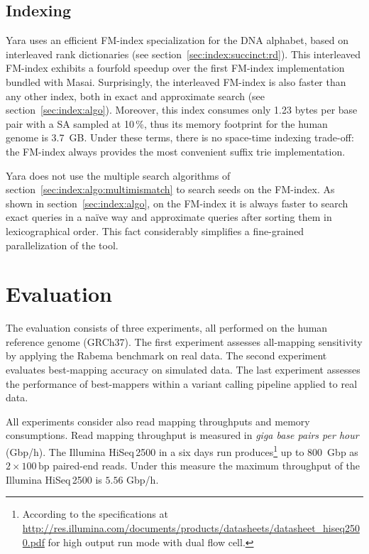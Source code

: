 \subsection{Indexing}
\label{sec:yara:eng:indexing}

Yara uses an efficient FM-index specialization for the DNA alphabet, based on interleaved rank dictionaries (see section~\ref{sec:index:succinct:rd}).
This interleaved FM-index exhibits a fourfold speedup over the first FM-index implementation bundled with Masai.
Surprisingly, the interleaved FM-index is also faster than any other index, both in exact and approximate search (see section~\ref{sec:index:algo}).
Moreover, this index consumes only 1.23 bytes per base pair with a SA sampled at 10\,\%, thus its memory footprint for the human genome is 3.7~GB.
Under these terms, there is no space-time indexing trade-off: the FM-index always provides the most convenient suffix trie implementation.

Yara does not use the multiple search algorithms of section~\ref{sec:index:algo:multimismatch} to search seeds on the FM-index.
As shown in section~\ref{sec:index:algo}, on the FM-index it is always faster to search exact queries in a na\"ive way and approximate queries after sorting them in lexicographical order.
This fact considerably simplifies a fine-grained parallelization of the tool.



\section{Evaluation}
\label{sec:yara:eval}

The evaluation consists of three experiments, all performed on the human reference genome (GRCh37).
The first experiment assesses all-mapping sensitivity by applying the Rabema benchmark on real data.
The second experiment evaluates best-mapping accuracy on simulated data.
The last experiment assesses the performance of best-mappers within a variant calling pipeline applied to real data.

All experiments consider also read mapping throughputs and memory consumptions.
Read mapping throughput is measured in \emph{giga base pairs per hour} (Gbp/h).
The Illumina HiSeq\,2500 in a six days run produces\footnote{According to the specifications at \url{http://res.illumina.com/documents/products/datasheets/datasheet_hiseq2500.pdf} for high output run mode with dual flow cell.} up to 800~Gbp as $2 \times 100\,\text{bp}$ paired-end reads.
Under this measure the maximum throughput of the Illumina HiSeq\,2500 is $5.56$ Gbp/h.

